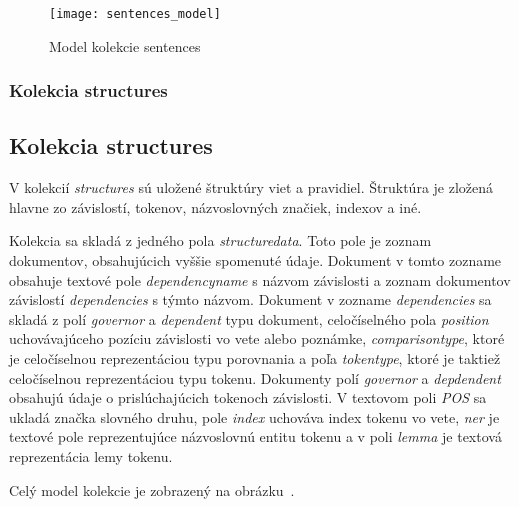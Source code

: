 \begin{figure}[H]
	\begin{center}\texttt{[image: sentences\_model]}\end{center}
	\caption[Model kolekcie sentences]{Model kolekcie sentences}\label{fig:sentences_collection_model}
\end{figure}

%
%
{
	\subsubsection{Kolekcia structures}
}
{
	\subsection{Kolekcia structures}
}
\label{subsubsection:collection_structures}
V kolekcií \textit{structures} sú uložené štruktúry viet a pravidiel. Štruktúra je zložená hlavne zo závislostí, tokenov, názvoslovných značiek, indexov a iné.

Kolekcia sa skladá z jedného pola \textit{structure\textunderscore data}. Toto pole je zoznam dokumentov, obsahujúcich vyššie spomenuté údaje. Dokument v tomto zozname obsahuje textové pole \textit{dependency\textunderscore name} s názvom závislosti a zoznam dokumentov závislostí \textit{dependencies} s týmto názvom. Dokument v zozname \textit{dependencies} sa skladá z polí \textit{governor} a \textit{dependent} typu dokument, celočíselného pola \textit{position} uchovávajúceho pozíciu závislosti vo vete alebo poznámke, \textit{comparison\textunderscore type}, ktoré je celočíselnou reprezentáciou typu porovnania a poľa \textit{token\textunderscore type}, ktoré je taktiež celočíselnou reprezentáciou typu tokenu. Dokumenty polí \textit{governor} a \textit{depdendent} obsahujú údaje o prislúchajúcich tokenoch závislosti. V textovom poli \textit{POS} sa ukladá značka slovného druhu, pole \textit{index} uchováva index tokenu vo vete, \textit{ner} je textové pole reprezentujúce názvoslovnú entitu tokenu a v poli \textit{lemma} je textová reprezentácia lemy tokenu.

Celý model kolekcie je zobrazený na obrázku~.

